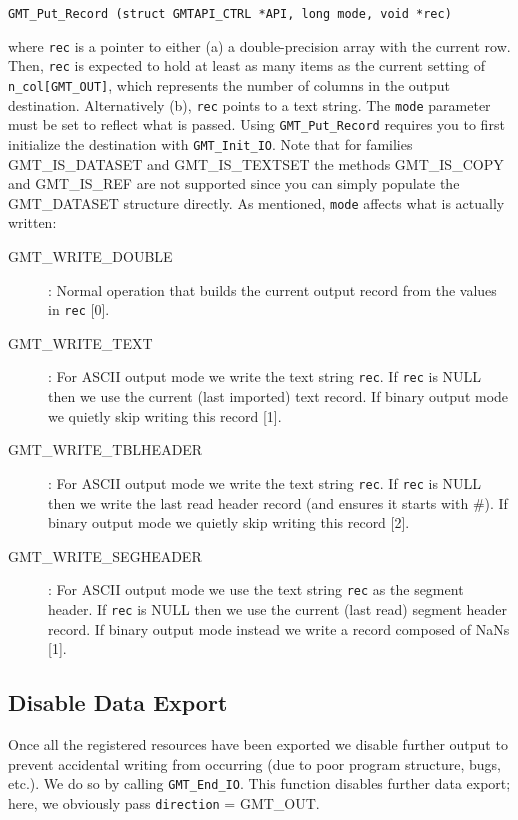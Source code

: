 \documentclass{report}
\begin{document}
\begin{verbatim}
GMT_Put_Record (struct GMTAPI_CTRL *API, long mode, void *rec)
\end{verbatim}
where \texttt{rec} is a pointer to either (a) a double-precision array with the current row.
Then, \texttt{rec} is expected to hold at least as many items as the current setting of
\texttt{n\_col[GMT\_OUT]}, which represents the number of columns in the output destination.
Alternatively (b), \texttt{rec} points to a text string.
The \texttt{mode} parameter must be set to reflect what is passed.  Using \texttt{GMT\_Put\_Record}
requires you to first initialize the destination with \texttt{GMT\_Init\_IO}.
Note that for families GMT\_IS\_DATASET and GMT\_IS\_TEXTSET the methods GMT\_IS\_COPY and GMT\_IS\_REF are not supported since
you can simply populate the GMT\_DATASET structure directly.
As mentioned, \texttt{mode} affects what is actually written:
\begin{description}
\item [GMT\_WRITE\_DOUBLE]: Normal operation that builds the current output record from
the values in \texttt{rec} [0].
\item [GMT\_WRITE\_TEXT]: For ASCII output mode we write the text string \texttt{rec}.
If \texttt{rec} is NULL then we use the current (last imported) text record.
If binary output mode we quietly skip writing this record [1].
\item [GMT\_WRITE\_TBLHEADER]: For ASCII output mode we write the text string \texttt{rec}.
If \texttt{rec} is NULL then we write the last read
header record (and ensures it starts with \#). If binary output mode we quietly skip writing this record [2].
\item [GMT\_WRITE\_SEGHEADER]: For ASCII output mode we use the text string \texttt{rec} as the segment header.
If \texttt{rec} is NULL then we use the current (last read) segment header record.
If binary output mode instead we write a record composed of NaNs [1].
\end{description}

\subsection{Disable Data Export}

Once all the registered resources have been exported we disable further output to prevent accidental
writing from occurring (due to poor program structure, bugs, etc.).  We do so by calling \texttt{GMT\_End\_IO}.  This
function disables further data export; here, we obviously pass \texttt{direction} = GMT\_OUT.
\end{document}
